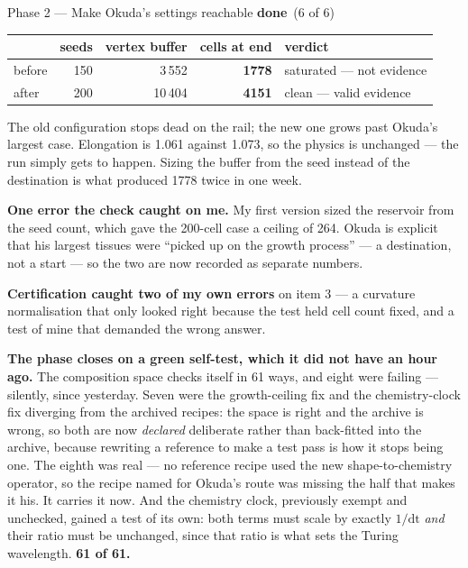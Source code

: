 \documentclass[11pt,a4paper]{article}
\newcommand{\dn}{\textcolor{good}{\textbf{done}}}
\begin{document}
\begin{phasebox}{Phase 2 --- Make Okuda's settings reachable \hfill \dn\ (6 of 6)}
\begin{center}\small
\begin{tabular}{@{}l r r r l@{}}
\toprule
& \textbf{seeds} & \textbf{vertex buffer} & \textbf{cells at end} & \textbf{verdict}\\
\midrule
before & 150 & 3\,552  & \textbf{1778} & saturated --- not evidence\\
after  & 200 & 10\,404 & \textbf{4151} & clean --- valid evidence\\
\bottomrule
\end{tabular}
\end{center}

The old configuration stops dead on the rail; the new one grows past Okuda's largest case.
Elongation is 1.061 against 1.073, so the physics is unchanged --- the run simply gets to happen.
Sizing the buffer from the seed instead of the destination is what produced 1778 twice in one week.

\textbf{One error the check caught on me.} My first version sized the reservoir from the seed
count, which gave the 200-cell case a ceiling of 264. Okuda is explicit that his largest tissues
were ``picked up on the growth process'' --- a destination, not a start --- so the two are now
recorded as separate numbers.

\textbf{Certification caught two of my own errors} on item 3 --- a curvature normalisation that only
looked right because the test held cell count fixed, and a test of mine that demanded the wrong
answer.

\textbf{The phase closes on a green self-test, which it did not have an hour ago.} The composition
space checks itself in 61 ways, and eight were failing --- silently, since yesterday. Seven were the
growth-ceiling fix and the chemistry-clock fix diverging from the archived recipes: the space is
right and the archive is wrong, so both are now \emph{declared} deliberate rather than back-fitted
into the archive, because rewriting a reference to make a test pass is how it stops being one. The
eighth was real --- no reference recipe used the new shape-to-chemistry operator, so the recipe
named for Okuda's route was missing the half that makes it his. It carries it now. And the
chemistry clock, previously exempt and unchecked, gained a test of its own: both terms must scale
by exactly $1/\mathrm{dt}$ \emph{and} their ratio must be unchanged, since that ratio is what sets
the Turing wavelength. \textbf{61 of 61.}
\end{phasebox}
\end{document}
